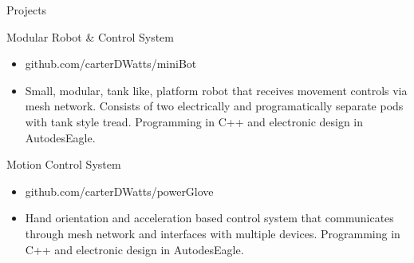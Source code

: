 \documentclass[]{mcdowellcv}
\begin{document}
        \begin{cvsection}{Projects}
		\begin{cvsubsection}{Modular Robot \& Control System}{}{}
			\begin{itemize}
                \item github.com/carterDWatts/miniBot 
                \item Small, modular, tank like, platform robot that receives movement controls via mesh network. Consists of two electrically and programatically separate pods with tank style tread. Programming in C++ and electronic design in AutodesEagle.
			\end{itemize}
		\end{cvsubsection}

            \begin{cvsubsection}{Motion Control System}{}{}
			\begin{itemize}
                \item github.com/carterDWatts/powerGlove
                \item Hand orientation and acceleration based control system that communicates through mesh network and interfaces with multiple devices. Programming in C++ and electronic design in AutodesEagle.
			\end{itemize}
		\end{cvsubsection}

         
        \end{cvsection}
    	
\end{document}
